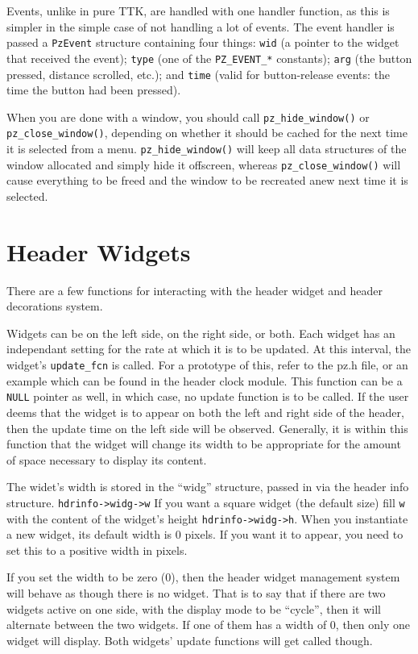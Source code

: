 \documentclass[12pt,letterpaper]{report}
\begin{document}
Events, unlike in pure TTK, are handled with one handler function, as this is simpler in
the simple case of not handling a lot of events. The event handler is passed a \verb|PzEvent|
structure containing four things: \verb|wid| (a pointer to the widget that received the event);
\verb|type| (one of the \verb|PZ_EVENT_*| constants); \verb|arg| (the button pressed, distance
scrolled, etc.); and \verb|time| (valid for button-release events: the time the button had been
pressed).

When you are done with a window, you should call \verb|pz_hide_window()| or \verb|pz_close_window()|,
depending on whether it should be cached for the next time it is selected from a menu.
\verb|pz_hide_window()| will keep all data structures of the window allocated and simply hide
it offscreen, whereas \verb|pz_close_window()| will cause everything to be freed and the window
to be recreated anew next time it is selected.

\section{Header Widgets}

There are a few functions for interacting with the header widget
and header decorations system.

Widgets can be on the left side, on the right side, or both.  Each
widget has an independant setting for the rate at which 
it is to be updated.  At this interval, the widget's \verb|update_fcn|
is called.  For a prototype of this, refer to the pz.h file, or an
example which can be found in the header clock module.  This function
can be a \verb|NULL| pointer as well, in which case, no update
function is to be called.  If the user deems that the widget is to
appear on both the left and right side of the header, then the
update time on the left side will be observed.  Generally, it is
within this function that the widget will change its width to be
appropriate for the amount of space necessary to display its content.

The widet's width is stored in the ``widg'' structure, passed in
via the header info structure.  \verb|hdrinfo->widg->w| If you want
a square widget (the default size) fill \verb|w| with the content
of the widget's height \verb|hdrinfo->widg->h|.  When you instantiate
a new widget, its default width is 0 pixels.  If you want it to
appear, you need to set this to a positive width in pixels.

If you set the width to be zero (0), then the header widget management
system will behave as though there is no widget.  That is to say
that if there are two widgets active on one side, with the display
mode to be ``cycle'', then it will alternate between the two widgets.
If one of them has a width of 0, then only one widget will display.
Both widgets' update functions will get called though.
\end{document}

